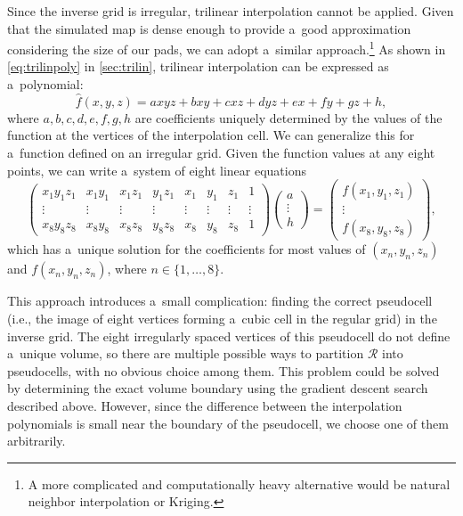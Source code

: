 			Since the inverse grid is irregular, trilinear interpolation cannot be applied. Given that the simulated map is dense enough to provide a~good approximation considering the size of our pads, we can adopt a~similar approach.\footnote{A more complicated and computationally heavy alternative would be natural neighbor interpolation or Kriging.} As shown in \cref{eq:trilinpoly} in \cref{sec:trilin}, trilinear interpolation can be expressed as a~polynomial:
				\begin{equation}
					\widehat{f}(x,y,z) = axyz + bxy + cxz + dyz + ex + fy + gz + h,
				\end{equation}
			where $a,b,c,d,e,f,g,h$ are coefficients uniquely determined by the values of the function at the vertices of the interpolation cell. We can generalize this for a~function defined on an irregular grid. Given the function values at any eight points, we can write a~system of eight linear equations
				\begin{equation}
					\begin{pmatrix}
						x_1 y_1 z_1 & x_1 y_1 & x_1 z_1 & y_1 z_1 & x_1 & y_1 & z_1 & 1\\
						\vdots & \vdots & \vdots & \vdots & \vdots & \vdots & \vdots & \vdots\\
						x_8 y_8 z_8 & x_8 y_8 & x_8 z_8 & y_8 z_8 & x_8 & y_8 & z_8 & 1
					\end{pmatrix}
					\begin{pmatrix}
						a\\
						\vdots\\
						h
					\end{pmatrix}
					=
					\begin{pmatrix}
						f(x_1,y_1,z_1)\\
						\vdots\\
						f(x_8,y_8,z_8)
					\end{pmatrix},
				\end{equation}
			which has a~unique solution for the coefficients for most values of $(x_n, y_n, z_n)$ and $f(x_n,y_n,z_n)$, where $n\in\{1,\ldots,8\}$.
			
			This approach introduces a~small complication: finding the correct pseudocell (i.e., the image of eight vertices forming a~cubic cell in the regular grid) in the inverse grid. The eight irregularly spaced vertices of this pseudocell do not define a~unique volume, so there are multiple possible ways to partition $\mathcal{R}$ into pseudocells, with no obvious choice among them. This problem could be solved by determining the exact volume boundary using the gradient descent search described above. However, since the difference between the interpolation polynomials is small near the boundary of the pseudocell, we choose one of them arbitrarily.
			
